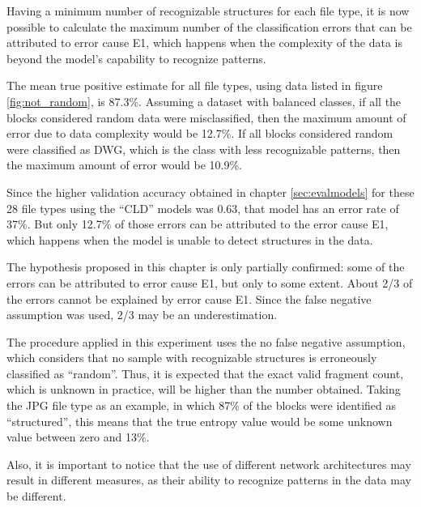 Having a minimum number of recognizable structures for each file type, it is now possible to calculate the maximum number of the classification errors that can be attributed to error cause E1, which happens when the complexity of the data is beyond the model’s capability to recognize patterns.

The mean true positive estimate for all file types, using data listed in figure \ref{fig:not_random}, is 87.3\%.  Assuming a dataset with balanced classes, if all the blocks considered random data were misclassified, then the maximum amount of error due to data complexity would be 12.7\%. If all blocks considered random were classified as DWG, which is the class with less recognizable patterns, then the maximum amount of error would be 10.9\%.

Since the higher validation accuracy obtained in chapter \ref{sec:evalmodels} for these 28 file types using the ``CLD'' models was 0.63, that model has an error rate of 37\%. But only 12.7\% of those errors can be attributed to the error cause E1, which happens when the model is unable to detect structures in the data.

The hypothesis proposed in this chapter is only partially confirmed: some of the errors can be attributed to error cause E1, but only to some extent. About 2/3 of the errors cannot be explained by error cause E1. Since the false negative assumption was used, 2/3 may be an underestimation.


The procedure applied in this experiment uses the no false negative assumption, which considers that no sample with recognizable structures is erroneously classified as ``random''. Thus, it is expected that the exact valid fragment count, which is unknown in practice, will be higher than the number obtained. Taking the JPG file type as an example, in which 87\% of the blocks were identified as ``structured'', this means that the true entropy value would be some unknown value between zero and 13\%.

Also, it is important to notice that the use of different network architectures may result in different measures, as their ability to recognize patterns in the data may be different.